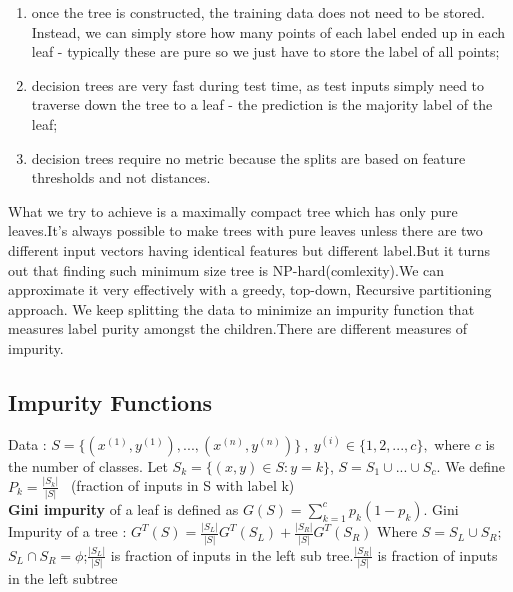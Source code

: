 \documentclass[12pt]{article}
\begin{document}
 \begin{enumerate}
 
 \item  once the tree is constructed, the training data does not need to be stored. Instead, we can simply store how many points of each label ended up in each leaf - typically these are pure so we just have to store the label of all points; \item  decision trees are very fast during test time, as test inputs simply need to traverse down the tree to a leaf - the prediction is the majority label of the leaf; \item  decision trees require no metric because the splits are based on feature thresholds and not distances.
 
  \end{enumerate}
 
 
 What we try to achieve is a maximally compact tree which has only pure leaves.It's always possible to make trees with pure leaves unless there are two different input vectors having identical features but different label.But it turns out that finding such minimum size tree is NP-hard(comlexity).We can approximate it very effectively with a greedy, top-down, Recursive partitioning approach.
 We keep splitting the data to minimize an impurity function that measures label purity amongst the children.There are different measures of impurity.
 
 
 
 \subsection{Impurity Functions}
 Data : $S = \{(x^{(1)},y^{(1)}),...,(x^{(n)},y^{(n)})\} \ , \ y^{(i)} \in \{1,2,...,c\},$ where $c$ is the number of classes. Let $S_{k} = \{(x,y) \in S : y  = k\}$, $S = S_{1} \cup ... \cup S_{c}.$ We define $P_{k} = \frac{\vert S_{k} \vert}{\vert S \vert}$ \ (fraction of inputs in S with label k) \\ 
 
\textbf{Gini impurity} of a leaf is defined as $G(S) = \sum_{k = 1}^{c} p_{k}(1 - p_{k})$.
Gini Impurity of a tree  : $G^{T}(S) = \frac{\vert S_{L} \vert}{\vert S \vert} G^{T}(S_{L}) + \frac{\vert S_{R} \vert}{\vert S \vert} G^{T}(S_{R})$
Where $S = S_{L} \cup S_{R}$;
$S_{L} \cap S_{R}  = \phi$;$\frac{\vert S_{L} \vert}{\vert S \vert} $ is fraction of inputs in the left sub tree.$\frac{\vert S_{R} \vert}{\vert S \vert}$ is fraction of inputs in the left subtree 
\end{document}
